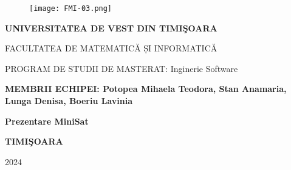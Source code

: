\documentclass[12pt,a4paper]{report}
\begin{document}

\begin{titlepage}
    \begin{center}
\begin{figure}[h!]
\vspace{-20pt}
\begin{center}
\texttt{[image: FMI-03.png]}
\end{center}
\end{figure}


{\large{\bf UNIVERSITATEA DE VEST DIN TIMI\c SOARA

FACULTATEA DE MATEMATICĂ ȘI INFORMATICĂ

PROGRAM DE STUDII DE MASTERAT: Inginerie Software}}

\vspace{30pt}
{\large{\bf MEMBRII ECHIPEI: Potopea Mihaela Teodora, Stan Anamaria, Lunga Denisa, Boeriu Lavinia}}

\vspace{120pt}
{\huge {\bf Prezentare MiniSat  }}

\vspace{160pt}
\end{center}
\vfill
\begin{center}
{\bf TIMI\c SOARA

2024}
\end{center}

\end{titlepage}








\end{document}
